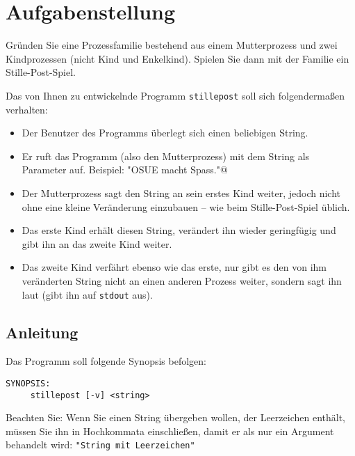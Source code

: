 




\section*{Aufgabenstellung}

Gründen Sie eine Prozessfamilie bestehend aus einem Mutterprozess und
zwei Kindprozessen (nicht Kind und Enkelkind). Spielen Sie dann mit
der Familie ein Stille-Post-Spiel.

Das von Ihnen zu entwickelnde Programm {\tt stillepost} soll sich
folgendermaßen verhalten:

\begin{itemize}
\item Der Benutzer des Programms überlegt sich einen beliebigen
String.
\item Er ruft das Programm (also den Mutterprozess) mit dem String als
Parameter auf. Beispiel:
\verb@stillepost "OSUE macht Spass."@
\item Der Mutterprozess sagt den String an sein erstes Kind weiter,
jedoch nicht ohne eine kleine Veränderung einzubauen – wie beim
Stille-Post-Spiel üblich.
\item Das erste Kind erhält diesen String, verändert ihn wieder
geringfügig und gibt ihn an das zweite Kind weiter.
\item Das zweite Kind verfährt ebenso wie das erste, nur gibt es den
von ihm veränderten String nicht an einen anderen Prozess weiter,
sondern sagt ihn laut (gibt ihn auf {\tt stdout} aus).
\end{itemize}





\subsection*{Anleitung}

Das Programm soll folgende Synopsis befolgen:
\begin{verbatim}
SYNOPSIS:
     stillepost [-v] <string>
\end{verbatim}

Beachten Sie: Wenn Sie einen String übergeben wollen, der Leerzeichen
enthält, müssen Sie ihn in Hochkommata einschließen, damit er als
nur ein Argument behandelt wird: \verb_"String mit Leerzeichen"_

